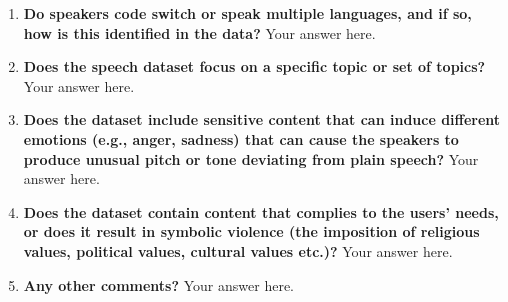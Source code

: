 \documentclass{article}
\begin{document}
\begin{enumerate}[leftmargin=0.65cm]
     

        \item \textbf{Do speakers code switch or speak multiple languages, and if so, how is this identified in the data?}
        \newline 
        Your answer here.
        \newline 
        
        \item \textbf{Does the speech dataset focus on a specific topic or set of topics?}
        \newline 
        Your answer here.
        \newline 
      
        
        \item \textbf{Does the dataset include sensitive content that can induce different emotions (e.g., anger, sadness) that can cause the speakers to produce unusual pitch or tone deviating from plain speech?}
        \newline 
        Your answer here.
        \newline 
        
        \item \textbf{Does the dataset contain content that complies to the users' needs, or does it result in symbolic violence (the imposition of religious values, political values, cultural values etc.)?}
        \newline 
        Your answer here.
        \newline 
          
        \item \textbf{Any other comments?}
        \newline 
        Your answer here.
        \newline 
    
    \end{enumerate}
    
\end{document}
